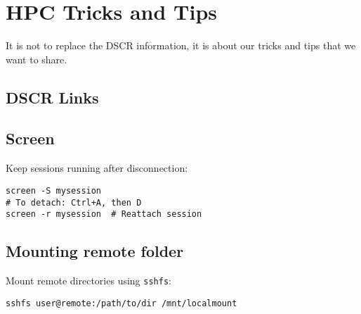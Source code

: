 \section{HPC Tricks and Tips}
It is not to replace the DSCR information, it is about our tricks and tips that we want to share. 
\subsection{DSCR Links}

\subsection{Screen}
Keep sessions running after disconnection:
\begin{lstlisting}
screen -S mysession
# To detach: Ctrl+A, then D
screen -r mysession  # Reattach session
\end{lstlisting}

\subsection{Mounting remote folder}
Mount remote directories using \texttt{sshfs}:
\begin{lstlisting}
sshfs user@remote:/path/to/dir /mnt/localmount
\end{lstlisting}
